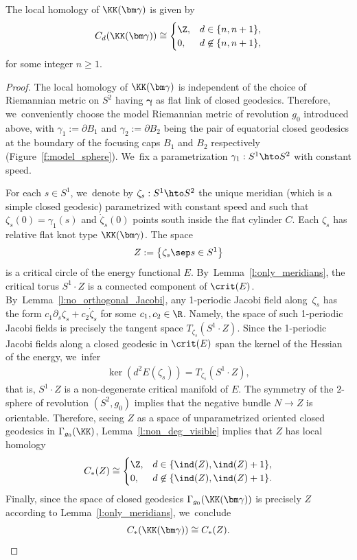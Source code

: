 \begin{Lemma}\label{l:K_gamma1_gamma2}
The local homology of $\KK(\bm\gamma)$ is given by
\begin{align*}
C_d(\KK(\bm\gamma))
\cong
\begin{cases}
\Z, & d\in\{n,n+1\}, \\
0, & d\not\in\{n,n+1\},
\end{cases}
\end{align*}
for some integer $n\geq1$.
\end{Lemma}

\begin{proof}
The local homology of $\KK(\bm\gamma)$ is independent of the choice of Riemannian metric on $S^2$ having $\bm\gamma$ as flat link of closed geodesics. Therefore, we~conveniently choose the model Riemannian metric of revolution $g_0$ introduced above, with $\gamma_1:=\partial B_1$ and $\gamma_2:=\partial B_2$ being the pair of equatorial closed geodesics at the boundary of the focusing caps $B_1$ and $B_2$ respectively (Figure~\ref{f:model_sphere}). We~fix a parametrization $\gamma_1:S^1\hto S^2$ with constant speed.

For each $s\in S^1$, we~denote by $\zeta_s:S^1\hto S^2$ the unique meridian (which is a simple closed geodesic) parametrized with constant speed and such that $\zeta_s(0)=\gamma_1(s)$ and $\dot\zeta_s(0)$ points south inside the flat cylinder $C$. Each $\zeta_s$ has relative flat knot type $\KK(\bm\gamma)$.
The space
\[
Z:=\big\{\zeta_s\sep s\in S^1\big\}
\]
is a critical circle of the energy functional $E$. By~Lemma~\ref{l:only_meridians}, the critical torus $S^1\cdot Z$ is a connected component of $\crit(E)$. By~Lemma~\ref{l:no_orthogonal_Jacobi}, any 1-periodic Jacobi field along~$\zeta_s$ has the form $c_1\partial_s\zeta_s+c_2\dot\zeta_s$ for some $c_1,c_2\in\R$. Namely, the space of such 1-periodic Jacobi fields is precisely the tangent space $T_{\zeta_s}(S^1\cdot Z)$. Since the 1-periodic Jacobi fields along a closed geodesic in $\crit(E)$ span the kernel of the Hessian of the energy, we~infer
\begin{align*}
\ker(d^2E(\zeta_s)) = T_{\zeta_s}(S^1\cdot Z),
\end{align*}
that is, $S^1\cdot Z$ is a non-degenerate critical manifold of $E$. The symmetry of the $2$\nobreakdash-sphere of revolution $(S^2,g_0)$ implies that the negative bundle $N\to Z$ is orientable. Therefore, seeing $Z$ as a space of unparametrized oriented closed geodesics in $\Gamma_{g_0}(\KK)$, Lemma~\ref{l:non_deg_visible} implies that $Z$ has local homology
\begin{align*}
C_*(Z)
\cong
\begin{cases}
\Z, & d\in\{\ind(Z),\ind(Z)+1\}, \\
0, & d\not\in\{\ind(Z),\ind(Z)+1\}.
\end{cases}
\end{align*}
Finally, since the space of closed geodesics $\Gamma_{g_0}(\KK(\bm\gamma))$ is precisely $Z$ according to Lemma~\ref{l:only_meridians}, we~conclude
\[
C_*(\KK(\bm\gamma))\cong C_*(Z).
\qedhere
\]
\end{proof}

